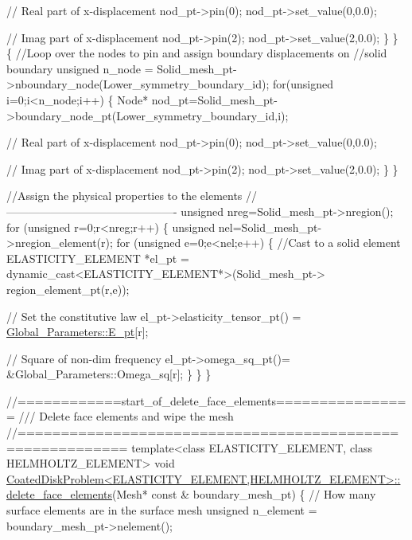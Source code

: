 \begin{DoxyCodeInclude}
{    \textcolor{comment}{// Real part of x-displacement }
    nod\_pt->pin(0);
    nod\_pt->set\_value(0,0.0);
    
    \textcolor{comment}{// Imag part of x-displacement}
    nod\_pt->pin(2);
    nod\_pt->set\_value(2,0.0);
   \}
 \}
 \{
  \textcolor{comment}{//Loop over the nodes to pin and assign boundary displacements on }
  \textcolor{comment}{//solid boundary}
  \textcolor{keywordtype}{unsigned} n\_node = Solid\_mesh\_pt->nboundary\_node(Lower\_symmetry\_boundary\_id);
  \textcolor{keywordflow}{for}(\textcolor{keywordtype}{unsigned} i=0;i<n\_node;i++)
   \{
    Node* nod\_pt=Solid\_mesh\_pt->boundary\_node\_pt(Lower\_symmetry\_boundary\_id,i);

    \textcolor{comment}{// Real part of x-displacement }
    nod\_pt->pin(0);
    nod\_pt->set\_value(0,0.0);
    
    \textcolor{comment}{// Imag part of x-displacement}
    nod\_pt->pin(2);
    nod\_pt->set\_value(2,0.0);
   \}
 \}



 \textcolor{comment}{//Assign the physical properties to the elements}
 \textcolor{comment}{//----------------------------------------------}
 \textcolor{keywordtype}{unsigned} nreg=Solid\_mesh\_pt->nregion();
 \textcolor{keywordflow}{for} (\textcolor{keywordtype}{unsigned} r=0;r<nreg;r++)
  \{
   \textcolor{keywordtype}{unsigned} nel=Solid\_mesh\_pt->nregion\_element(r);
   \textcolor{keywordflow}{for} (\textcolor{keywordtype}{unsigned} e=0;e<nel;e++)
    \{     
     \textcolor{comment}{//Cast to a solid element}
     ELASTICITY\_ELEMENT *el\_pt = 
      \textcolor{keyword}{dynamic\_cast<}ELASTICITY\_ELEMENT*\textcolor{keyword}{>}(Solid\_mesh\_pt->
                                        region\_element\_pt(r,e));
     
     \textcolor{comment}{// Set the constitutive law}
     el\_pt->elasticity\_tensor\_pt() = \hyperlink{namespaceGlobal__Parameters_a73c731fa617a9d92851e4195493262e7}{Global\_Parameters::E\_pt}[r];
     
     \textcolor{comment}{// Square of non-dim frequency}
     el\_pt->omega\_sq\_pt()= &Global\_Parameters::Omega\_sq[r];
    \}
  \}    
\}

\textcolor{comment}{//============start\_of\_delete\_face\_elements================}\textcolor{comment}{}
\textcolor{comment}{/// Delete face elements and wipe the mesh}
\textcolor{comment}{}\textcolor{comment}{//==========================================================}
\textcolor{keyword}{template}<\textcolor{keyword}{class} ELASTICITY\_ELEMENT, \textcolor{keyword}{class} HELMHOLTZ\_ELEMENT>
\textcolor{keywordtype}{void} \hyperlink{classCoatedDiskProblem_a55b4cead41e01ab5fd728b607f62bb74}{CoatedDiskProblem<ELASTICITY\_ELEMENT,HELMHOLTZ\_ELEMENT>::}
\hyperlink{classCoatedDiskProblem_a55b4cead41e01ab5fd728b607f62bb74}{delete\_face\_elements}(Mesh* \textcolor{keyword}{const} & boundary\_mesh\_pt)
\{
 \textcolor{comment}{// How many surface elements are in the surface mesh}
 \textcolor{keywordtype}{unsigned} n\_element = boundary\_mesh\_pt->nelement();

}
\end{DoxyCodeInclude}
